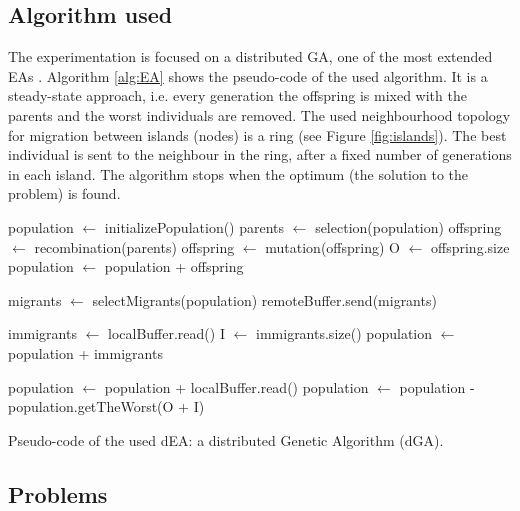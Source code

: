 \documentclass[final,1p,times]{elsarticle}
\begin{document}
\subsection{Algorithm used}
The experimentation is focused on a distributed GA, one of the most extended EAs \cite{GeneticAlgorithmsEiben03}. Algorithm \ref{alg:EA} shows the pseudo-code of the  used algorithm.
It is a steady-state approach, i.e. every generation the offspring is mixed with the parents and the worst individuals are removed. The used neighbourhood topology for migration between islands (nodes) is a ring (see Figure \ref{fig:islands}). The best individual is sent to the neighbour in the ring, after a fixed number of generations in each island. The algorithm stops when the optimum (the solution to the problem) is found.  



\begin{algorithm}[htb]

\begin{algorithmic}
\STATE population $\gets$ initializePopulation()
    \STATE parents $\gets$ selection(population)
    \STATE offspring $\gets$ recombination(parents)
    \STATE offspring $\gets$ mutation(offspring)
    \STATE O $\gets$ offspring.size
    \STATE population $\gets$ population + offspring
    
      \STATE migrants $\gets$ selectMigrants(population)
      \STATE remoteBuffer.send(migrants)
    \ENDIF

      \STATE immigrants $\gets$ localBuffer.read()
      \STATE I $\gets$ immigrants.size()
      \STATE population $\gets$ population + immigrants
    \ENDIF
    
      \STATE population $\gets$ population + localBuffer.read()
    \ENDIF
    \STATE population $\gets$ population - population.getTheWorst(O + I)
\ENDWHILE

\end{algorithmic}

\caption{Pseudo-code of the used dEA: a distributed Genetic Algorithm (dGA).}
\label{alg:EA}
\end{algorithm}




\subsection{Problems}
\end{document}

